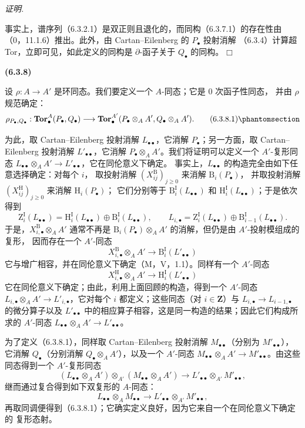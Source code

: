 \documentclass[UTF8,fontset=none,11pt,oneside,openany]{ctexbook}
\providecommand{\square}{\mdlgwhtsquare}
\newenvironment{env}[1][]{%
  \par\medskip\noindent\textbf{(#1)}\ %
}{\par}
\newenvironment{proof}{%
  \par\smallskip\noindent\textit{证明.}\ %
}{\hfill$\square$\par}
\newcommand{\oldpage}[2][]{%
  \hypertarget{ega-source-page-#1-#2}{}%
  \marginnote{\scriptsize\textbf{#1}~|~#2}\ignorespaces}
\let\EGAOriginalLabel\label
\renewcommand{\label}[1]{\phantomsection\EGAOriginalLabel{#1}}
\begin{document}
\begin{proof}
事实上，谱序列（6.3.2.1）是双正则且退化的，而同构（6.3.7.1）的存在性由
（0，11.1.6）推出。此外，由 Cartan--Eilenberg 的 $P_\bullet$ 投射消解
（6.3.4）计算超 Tor，立即可见，如此定义的同构是 $\partial$-函子关于
$Q_\bullet$ 的同构。
\end{proof}

\begin{env}[6.3.8]
\oldpage[III]{144}
设 $\rho:A\to A'$ 是环同态。我们要定义一个 $A$-同态；它是 0 次函子性同态，
并由 $\rho$ 规范确定：
\[
  \rho_{P_\bullet,Q_\bullet}:
  \mathbf{Tor}_\bullet^A(P_\bullet,Q_\bullet)
  \longrightarrow
  \mathbf{Tor}_\bullet^{A'}
  (P_\bullet\otimes_A A',Q_\bullet\otimes_A A').
  \tag{6.3.8.1}\label{III.6.3.8.1-fr}
\]

为此，取 Cartan--Eilenberg 投射消解
$L_{\bullet\bullet}$，它消解 $P_\bullet$；另一方面，取 Cartan--Eilenberg 投射消解
$L'_{\bullet\bullet}$，它消解 $P_\bullet\otimes_A A'$。我们将证明可以定义一个
$A'$-复形同态
$L_{\bullet\bullet}\otimes_A A'\to L'_{\bullet\bullet}$，它在同伦意义下确定。
事实上，$L_{\bullet\bullet}$ 的构造完全由如下任意选择确定：对每个 $i$，
取投射消解 $(X_{ij}^{\mathrm B})_{j\geqslant0}$ 来消解 $\mathrm B_i(P_\bullet)$，
并取投射消解 $(X_{ij}^{\mathrm H})_{j\geqslant0}$ 来消解 $\mathrm H_i(P_\bullet)$；
它们分别等于 $\mathrm B_i^{\mathrm I}(L_{\bullet\bullet})$ 和
$\mathrm H_i^{\mathrm I}(L_{\bullet\bullet})$；于是依次得到
\[
  \mathrm Z_i^{\mathrm I}(L_{\bullet\bullet})
  =\mathrm H_i^{\mathrm I}(L_{\bullet\bullet})
   \oplus\mathrm B_i^{\mathrm I}(L_{\bullet\bullet}),
  \qquad
  L_{i,\bullet}=\mathrm Z_i^{\mathrm I}(L_{\bullet\bullet})
   \oplus\mathrm B_{i-1}^{\mathrm I}(L_{\bullet\bullet}).
\]
于是，$X_{i,\bullet}^{\mathrm B}\otimes_A A'$ 通常不再是
$\mathrm B_i(P_\bullet)\otimes_A A'$ 的消解，但仍是由 $A'$-投射模组成的复形，
因而存在一个 $A'$-同态
\[
  X_{i,\bullet}^{\mathrm B}\otimes_A A'
  \longrightarrow \mathrm B_i^{\mathrm I}(L'_{\bullet\bullet})
\]
它与增广相容，并在同伦意义下确定（M，V，1.1）。同样有一个
$A'$-同态
\[
  X_{i,\bullet}^{\mathrm H}\otimes_A A'
  \longrightarrow \mathrm H_i^{\mathrm I}(L'_{\bullet\bullet})
\]
它在同伦意义下确定；由此，利用上面回顾的构造，得到一个
$A'$-同态 $L_{i,\bullet}\otimes_A A'\to L'_{i,\bullet}$，它对每个 $i$ 都定义；这些同态（对
$i\in\mathbf Z$）与 $L_{i,\bullet}\to L_{i-1,\bullet}$ 的微分算子以及
$L'_{\bullet\bullet}$ 中的相应算子相容，这是同一构造的结果；因此它们构成所求的
$A'$-同态
$L_{\bullet\bullet}\otimes_A A'\to L'_{\bullet\bullet}$。

为了定义（6.3.8.1），同样取 Cartan--Eilenberg 投射消解
$M_{\bullet\bullet}$（分别为 $M'_{\bullet\bullet}$），它消解 $Q_\bullet$（分别消解
$Q_\bullet\otimes_A A'$），以及一个
$A'$-同态 $M_{\bullet\bullet}\otimes_A A'\to M'_{\bullet\bullet}$。由这些同态得到一个
$A'$-复形同态
\[
  (L_{\bullet\bullet}\otimes_A A')\otimes_{A'}
  (M_{\bullet\bullet}\otimes_A A')
  \longrightarrow
  L'_{\bullet\bullet}\otimes_{A'}M'_{\bullet\bullet},
\]
继而通过复合得到如下双复形的 $A$-同态：
\[
  L_{\bullet\bullet}\otimes_A M_{\bullet\bullet}
  \longrightarrow
  L'_{\bullet\bullet}\otimes_{A'}M'_{\bullet\bullet},
\]
再取同调便得到（6.3.8.1）；它确实定义良好，因为它来自一个在同伦意义下确定的
复形态射。


\end{env}
\end{document}
